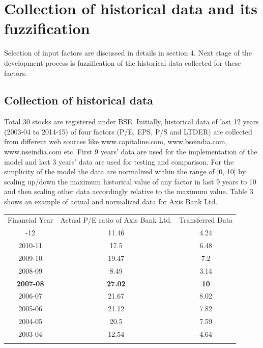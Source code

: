 \documentclass{ws-ijufks}
\begin{document}

\section{Collection of historical data and its fuzzification}

Selection of input factors are discussed in details in section 4. Next stage of the 
development process is fuzzification of the historical data collected for these factors.

\subsection{Collection of historical data} 
Total 30 stocks are registered under BSE. Initially, historical data of last 12 years 
(2003-04 to 2014-15) of four factors (P/E, EPS, P/S and LTDER) are collected from 
different web sources like www.capitaline.com, www.bseindia.com, 
www.nseindia.com etc. First 9 years' data are used for the implementation of the model 
and last 3 years' data are used for testing and comparison. For the simplicity of the 
model the data are normalized within the range of [0, 10] by scaling up/down the maximum 
historical value of any factor in last 9 years to 10 and then scaling other data 
accordingly relative to the maximum value. Table 3 shows an example of actual and normalized data for Axis Bank Ltd.

\begin{table}[ht]
	\label{tab:Normalized_sample}
	{\begin{tabular}{@{}ccc@{}} 
			\toprule
			Financial Year & Actual P/E ratio of Axis Bank Ltd. & Transferred Data \\
			\colrule
		2011-12	& 11.46	& 4.24 \\
		2010-11 &	17.5 &	6.48\\
		2009-10 &	19.47 &	7.2\\
		2008-09 &	8.49 &	3.14\\
		\bf 2007-08 &	\bf 27.02 &	\bf 10\\
		2006-07 &	21.67 &	8.02\\
		2005-06 &	21.12 &	7.82\\
		2004-05 &	20.5 &	7.59\\
		2003-04 &	12.54 &	4.64\\
		\botrule
		\end{tabular}}
	\end{table}
\end{document}
